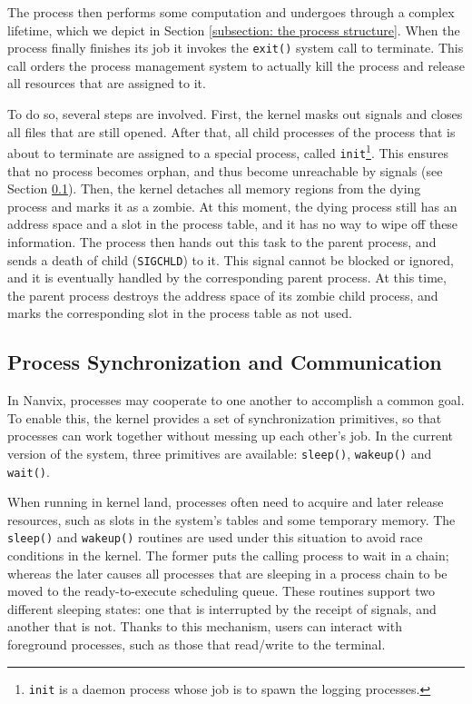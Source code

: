 \documentclass[10pt,a4paper]{article}
\begin{document}
The process then performs some computation and undergoes through a complex lifetime, which we depict in Section \ref{subsection: the process structure}. When the process finally finishes its job it invokes the \texttt{exit()} system call to terminate. This call orders the process management system to actually kill the process and release all resources that are assigned to it.

To do so, several steps are involved. First, the kernel masks out signals and closes all files that are still opened. After that, all child processes of the process that is about to terminate are assigned to a special process, called \texttt{init}\footnote{\texttt{init} is a daemon process whose job is to spawn the logging processes.}. This ensures that no process becomes orphan, and thus become unreachable by signals (see Section \ref{subsection: process synchronization and communication}). Then, the kernel detaches all memory regions from the dying process and marks it as a zombie. At this moment, the dying process still has an address space and a slot in the process table, and it has no way to wipe off these information. The process then hands out this task to the parent process, and sends a death of child (\texttt{SIGCHLD}) to it. This signal cannot be 
blocked or ignored, and it is eventually handled by the corresponding parent process. At this time, the parent process destroys the address space of its zombie child process, and marks the corresponding slot in the process table as not used.

\subsection{Process Synchronization and Communication}
\label{subsection: process synchronization and communication}

In Nanvix, processes may cooperate to one another to accomplish a common goal. To enable this, the kernel provides a set of synchronization primitives, so that processes can work together without messing up each other's job. In the current version of the system, three primitives are available: \texttt{sleep()}, \texttt{wakeup()} and \texttt{wait()}.

When running in kernel land, processes often need to acquire and later release resources, such as slots in the system's tables and some temporary memory. The \texttt{sleep()} and \texttt{wakeup()} routines are used under this situation to avoid race conditions in the kernel. The former puts the calling process to wait in a chain; whereas the later causes all processes that are sleeping in a process chain to be moved to the ready-to-execute scheduling queue. These routines support two different sleeping states: one that is interrupted by the receipt of signals, and another that is not. Thanks to this mechanism, users can interact with foreground processes, such as those that read/write to the terminal.
\end{document}
